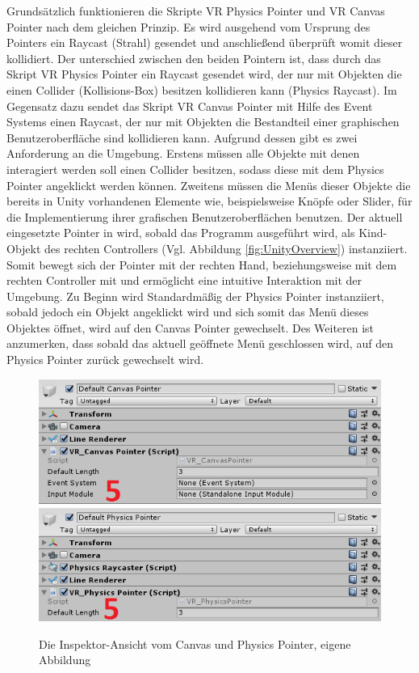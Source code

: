 \newline
Grundsätzlich funktionieren die Skripte VR Physics Pointer und VR Canvas Pointer nach dem gleichen Prinzip. Es wird ausgehend vom Ursprung des Pointers ein Raycast (Strahl) gesendet und anschließend überprüft womit dieser kollidiert. Der unterschied zwischen den beiden Pointern ist, dass durch das Skript VR Physics Pointer ein Raycast gesendet wird, der nur mit Objekten die einen Collider (Kollisions-Box) besitzen kollidieren kann (Physics Raycast). Im Gegensatz dazu sendet das Skript VR Canvas Pointer mit Hilfe des Event Systems einen Raycast, der nur mit Objekten die Bestandteil einer graphischen Benutzeroberfläche sind kollidieren kann. Aufgrund dessen gibt es zwei Anforderung an die Umgebung. Erstens müssen alle Objekte mit denen interagiert werden soll einen Collider besitzen, sodass diese mit dem Physics Pointer angeklickt werden können. Zweitens müssen die Menüs dieser Objekte die bereits in Unity vorhandenen Elemente wie, beispielsweise Knöpfe oder Slider, für die Implementierung ihrer grafischen Benutzeroberflächen benutzen.
\newline
Der aktuell eingesetzte Pointer in wird, sobald das Programm ausgeführt wird, als Kind-Objekt des rechten Controllers (Vgl. Abbildung \ref{fig:UnityOverview}) instanziiert. Somit bewegt sich der Pointer mit der rechten Hand, beziehungsweise mit dem rechten Controller mit und ermöglicht eine intuitive Interaktion mit der Umgebung. Zu Beginn wird Standardmäßig der Physics Pointer instanziiert, sobald jedoch ein Objekt angeklickt wird und sich somit das Menü dieses Objektes öffnet, wird auf den Canvas Pointer gewechselt. Des Weiteren ist anzumerken, dass sobald das aktuell geöffnete Menü geschlossen wird, auf den Physics Pointer zurück gewechselt wird.
\begin{figure}[h]
	\centering
	\includegraphics[width=0.49\linewidth]{Bilder/A42_CanvasPointer2}
	\includegraphics[width=0.49\linewidth]{Bilder/A43_PhysicsPointer2}
	\caption{Die Inspektor-Ansicht vom Canvas und Physics Pointer, eigene Abbildung}
	\label{fig:Pointer}
\end{figure}
